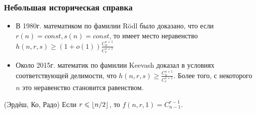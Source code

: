 \subsubsection*{Небольшая историческая справка}

\begin{itemize}
	\item В 1980г. математиком по фамилии Rödl было доказано, что если $r(n) = const, s(n) = const$, то имеет место неравенство \(h(n, r, s) \ge (1 + o(1)) \frac{C_n^{s + 1}}{C_r^{s + 1}}\)
	
	\item Около 2015г. математик по фамилии Keevash доказал в условиях соответствующей делимости, что $h(n, r, s) \ge \frac{C_n^{s + 1}}{C_r^{s + 1}}$. Более того, с некоторого $n$ это неравенство становится равенством.
\end{itemize}

\begin{theorem} (Эрдёш, Ко, Радо)
	Если $r \leqslant \left\lfloor n / 2 \right\rfloor$, то $f(n, r, 1) = C_{n - 1}^{r - 1}$.
\end{theorem}
